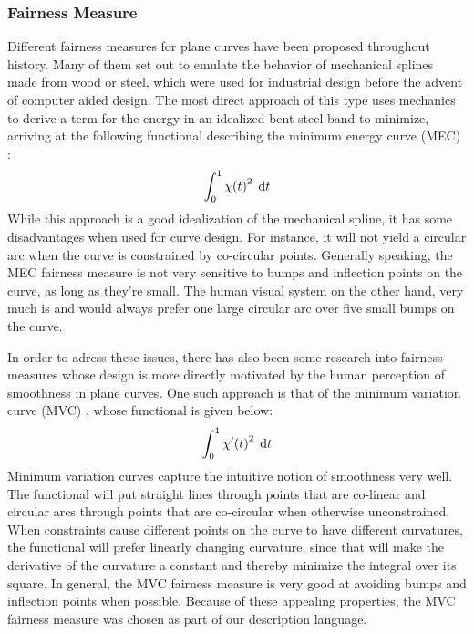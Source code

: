 \documentclass[a4paper]{article}
\begin{document}
			\subsubsection{Fairness Measure}
			\label{section:fairness_measure}


				Different fairness measures for plane curves have been proposed throughout history. Many of them set out to emulate the behavior of mechanical splines made from wood or steel, which were used for industrial design before the advent of computer aided design. The most direct approach of this type uses mechanics to derive a term for the energy in an idealized bent steel band to minimize, arriving at the following functional describing the minimum energy curve (MEC) \cite{paper-mec}:
				\begin{equation*}
					\int_{0}^{1} \chi\!\left( t \right)^2 \; \mathrm{d}t
				\end{equation*}
				While this approach is a good idealization of the mechanical spline, it has some disadvantages when used for curve design. For instance, it will not yield a circular arc when the curve is constrained by co-circular points. Generally speaking, the MEC fairness measure is not very sensitive to bumps and inflection points on the curve, as long as they're small. The human visual system on the other hand, very much is and would always prefer one large circular arc over five small bumps on the curve.

				In order to adress these issues, there has also been some research into fairness measures whose design is more directly motivated by the human perception of smoothness in plane curves. One such approach is that of the minimum variation curve (MVC) \cite{thesis-mvc}, whose functional is given below:
				\begin{equation*}
					\int_{0}^{1} \chi'\!\left( t \right)^2 \; \mathrm{d}t
				\end{equation*}
				Minimum variation curves capture the intuitive notion of smoothness very well. The functional will put straight lines through points that are co-linear and circular arcs through points that are co-circular when otherwise unconstrained. When constraints cause different points on the curve to have different curvatures, the functional will prefer linearly changing curvature, since that will make the derivative of the curvature a constant and thereby minimize the integral over its square. In general, the MVC fairness measure is very good at avoiding bumps and inflection points when possible. Because of these appealing properties, the MVC fairness measure was chosen as part of our description language.
\end{document}
